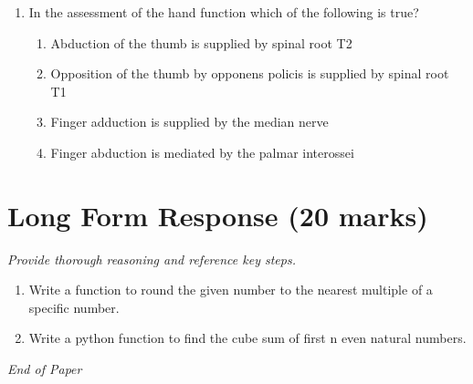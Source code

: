\documentclass[12pt]{article}
\begin{document}
\begin{enumerate}[label=\arabic*.]
\begin{enumerate}[label=(\alph*)]
    \item this will not affect the demand for the product right now.
    \item this will decrease the demand for the product.
    \item this will not affect the demand for the product now or later.
    \item this will increase the demand for the product.
\end{enumerate}
\item In the assessment of the hand function which of the following is true?
\begin{enumerate}[label=(\alph*)]
    \item Abduction of the thumb is supplied by spinal root T2
    \item Opposition of the thumb by opponens policis is supplied by spinal root T1
    \item Finger adduction is supplied by the median nerve
    \item Finger abduction is mediated by the palmar interossei
\end{enumerate}
\end{enumerate}

\section*{Long Form Response (20 marks)}
\textit{Provide thorough reasoning and reference key steps.}
\begin{enumerate}[label=\arabic*.]
\item Write a function to round the given number to the nearest multiple of a specific number.
\item Write a python function to find the cube sum of first n even natural numbers.
\end{enumerate}

\vfill
\noindent\textit{End of Paper}
\end{document}
